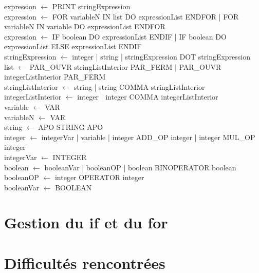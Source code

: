 ﻿\documentclass{report}
\begin{document}
expression $\leftarrow$ PRINT stringExpression\\

expression $\leftarrow$ FOR variableN IN list DO expressionList ENDFOR | FOR variableN IN variable DO expressionList ENDFOR\\

expression $\leftarrow$ IF boolean DO expressionList ENDIF | IF boolean DO expressionList ELSE expressionList ENDIF\\

stringExpression $\leftarrow$ integer | string | stringExpression DOT stringExpression\\

list $\leftarrow$ PAR\_OUVR stringListInterior PAR\_FERM | PAR\_OUVR integerListInterior PAR\_FERM\\

stringListInterior $\leftarrow$ string | string COMMA stringListInterior\\

integerListInterior $\leftarrow$ integer | integer COMMA integerListInterior\\

variable $\leftarrow$ VAR\\

variableN $\leftarrow$ VAR\\

string $\leftarrow$ APO STRING APO\\

integer $\leftarrow$ integerVar | variable | integer ADD\_OP integer | integer MUL\_OP integer\\

integerVar $\leftarrow$ INTEGER\\

boolean $\leftarrow$ booleanVar | booleanOP | boolean BINOPERATOR boolean\\

booleanOP $\leftarrow$ integer OPERATOR integer\\

booleanVar $\leftarrow$ BOOLEAN\\


\section*{ Gestion du if et du for}


\section*{ Difficultés rencontrées }
\end{document}
